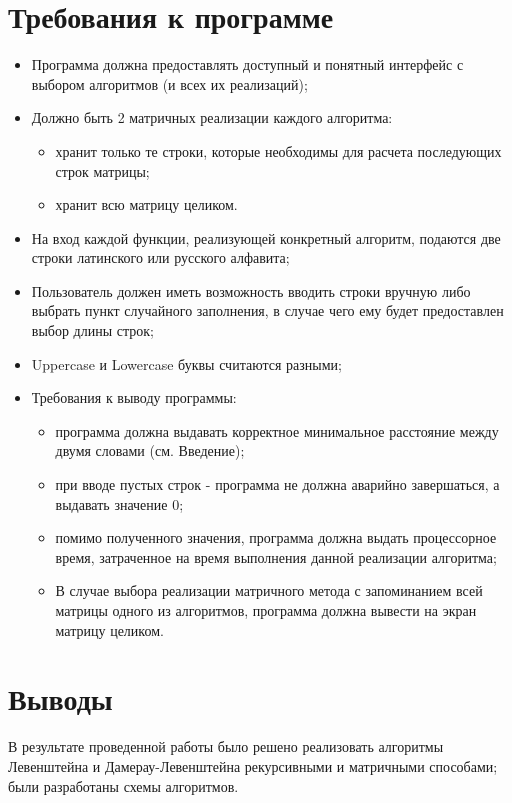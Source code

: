 \documentclass[12pt]{report}
\begin{document}
    \section{Требования к программе}
    \begin{itemize}
    	\item Программа должна предоставлять доступный и понятный интерфейс с выбором алгоритмов (и всех их реализаций);
    	\item Должно быть 2 матричных реализации каждого алгоритма:
    	\begin{itemize}
    		\item хранит только те строки, которые необходимы для расчета последующих строк матрицы;
    		\item хранит всю матрицу целиком.
    	\end{itemize}
    	\item На вход каждой функции, реализующей конкретный алгоритм, подаются две строки латинского или русского алфавита;
    	\item Пользователь должен иметь возможность вводить строки вручную либо выбрать пункт случайного заполнения, в случае чего ему будет предоставлен выбор длины строк;
    	\item Uppercase и Lowercase буквы считаются разными;	
    	\item Требования к выводу программы:
	    \begin{itemize}
	    	\item программа должна выдавать корректное минимальное расстояние между двумя словами (см. Введение);
	    	\item при вводе пустых строк - программа не должна аварийно завершаться, а выдавать значение 0;
	    	\item помимо полученного значения, программа должна выдать процессорное время, затраченное на время выполнения данной реализации алгоритма;
	    	\item В случае выбора реализации матричного метода с запоминанием всей матрицы одного из алгоритмов, программа должна вывести на экран матрицу целиком.
	    \end{itemize}
    \end{itemize}
    
    
    \section{Выводы}
    В результате проведенной работы было решено реализовать алгоритмы Левенштейна и Дамерау-Левенштейна рекурсивными и матричными способами; были разработаны схемы алгоритмов.
    
\end{document}
